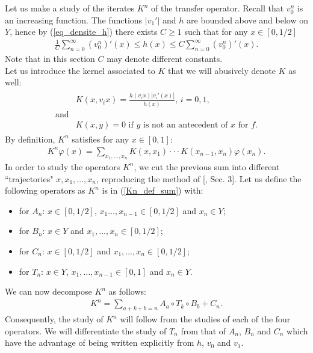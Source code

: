 \documentclass{ws-sd}
\newcommand{\abs}[1]{\left\lvert #1 \right\rvert}
\begin{document}
Let us make a study of the iterates $K^n$ of the transfer operator.
Recall that $v_0^n$ is an increasing function.
The functions $\abs{v_1'}$ and $h$ are bounded above and below on $Y$, hence by (\ref{eq_densite_h}) there exists $C \ge 1$ such that for any $x \in [0,1/2]$
\begin{align}\label{encadrement_h}
    \frac{1}{C} \sum_{n=0}^{\infty} {(v_0^n)'(x)} \le h(x) \le C \sum_{n=0}^{\infty} {(v_0^n)'(x)}.
\end{align}
Note that in this section $C$ may denote different constants.
\\
Let us introduce the kernel associated to $K$ that we will abusively denote $K$ as well:
\begin{align*}
\begin{array}{ll}
    &K(x,v_ix) = \frac{h(v_ix)\abs{v_i'(x)}}{h(x)}, \, i=0,1,\\
    \text{and} &  \\
    & K(x,y) = 0 \text{ if } y \text{ is not an antecedent of } x \text{ for } f.
\end{array}
\end{align*}
By definition, $K^n$ satisfies for any $x \in [0,1]$:
\begin{align}\label{Kn_def_sum}
    K^n \varphi(x) = \sum_{x_1,\ldots,x_n} K(x,x_1)\cdot \cdot \cdot K(x_{n-1},x_n)\varphi(x_n).
\end{align}
In order to study the operators $K^n$, we cut the previous sum into different ``trajectories" $x,x_1,\ldots,x_n$, reproducing the method of [, Sec. 3]. Let us define the following operators as $K^n$ is in (\ref{Kn_def_sum}) with:
\begin{itemize}
    \item for $A_n$: $x \in [0,1/2]$, $x_1\ldots,x_{n-1} \in [0,1/2]$ and $x_n \in Y$;
    \item for $B_n$: $x \in Y$ and $x_1,\ldots,x_n \in [0,1/2]$;
    \item for $C_n$: $x \in [0,1/2]$ and $x_1,\ldots,x_{n} \in [0,1/2]$;
    \item for $T_n$: $x \in Y$, $x_1,\ldots,x_{n-1} \in [0,1]$ and $x_n \in Y$.
\end{itemize}
We can now decompose $K^n$ as follows:
\begin{align}\label{itérées_Kn}
    K^n = \sum_{a+k+b =n} A_a \circ T_k \circ B_b + C_n.
\end{align}
Consequently, the study of $K^n$ will follow from the studies of each of the four operators. We will differentiate the study of $T_n$ from that of $A_n$, $B_n$ and $C_n$ which have the advantage of being written explicitly from $h$, $v_0$ and $v_1$.
\end{document}
